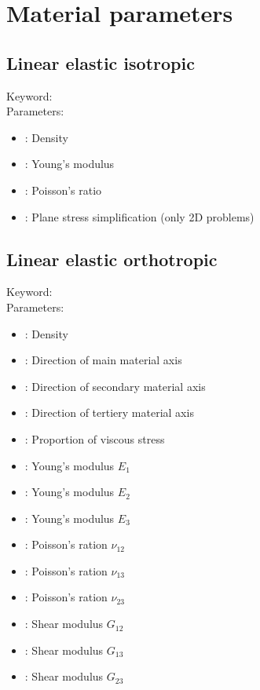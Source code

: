 \chapter{Material parameters}
\label{cha:material-parameters}

\section{Linear elastic isotropic}

Keyword: \\

\noindent Parameters:
\begin{itemize}
\item {}: Density
\item {}: Young's modulus
\item {}: Poisson's ratio
\item {}: Plane stress simplification (only 2D problems)
\end{itemize}

\section{Linear elastic orthotropic}

Keyword: \\

\noindent Parameters:
\begin{itemize}
\item {}: Density
\item {}: Direction of main material axis
\item {}: Direction of secondary material axis
\item {}: Direction of tertiery material axis
\item {}: Proportion of viscous stress
\item {}: Young's modulus $E_1$
\item {}: Young's modulus $E_2$
\item {}: Young's modulus $E_3$
\item {}: Poisson's ration $\nu_{12}$
\item {}: Poisson's ration $\nu_{13}$
\item {}: Poisson's ration $\nu_{23}$
\item {}: Shear modulus $G_{12}$
\item {}: Shear modulus $G_{13}$
\item {}: Shear modulus $G_{23}$
\end{itemize}

